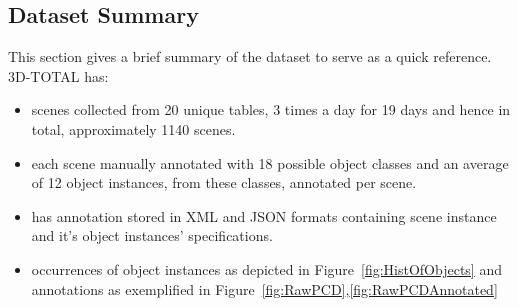 \documentclass[letterpaper, 10 pt, conference]{ieeeconf}  %
\begin{document}
\subsection{Dataset Summary}
\label{ssec:Dataset Summary}
This section gives a brief summary of the dataset to serve as a quick reference.
\noindent 3D-TOTAL has:
\begin{itemize}
	\item scenes collected from 20 unique tables, 3 times a day for 19 days and hence in total, approximately 1140 scenes.
	\item each scene manually annotated with 18 possible object classes and an average of 12 object instances, from these classes, annotated per scene.
	\item has annotation stored in XML and JSON formats containing scene instance and it's object instances' specifications.
	\item occurrences of object instances as depicted in Figure~\ref{fig:HistOfObjects} and annotations as exemplified in Figure~\ref{fig:RawPCD},\ref{fig:RawPCDAnnotated}
\end{itemize}
\end{document}
